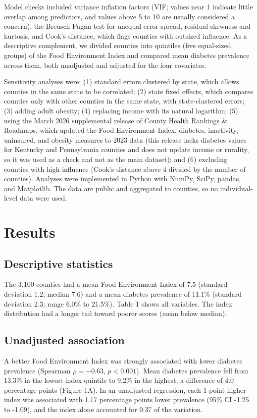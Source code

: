 \documentclass[12pt]{article}
\begin{document}
Model checks included variance inflation factors (VIF; values near 1 indicate little overlap among predictors, and values above 5 to 10 are usually considered a concern), the Breusch-Pagan test for unequal error spread, residual skewness and kurtosis, and Cook's distance, which flags counties with outsized influence. As a descriptive complement, we divided counties into quintiles (five equal-sized groups) of the Food Environment Index and compared mean diabetes prevalence across them, both unadjusted and adjusted for the four covariates.

Sensitivity analyses were: (1) standard errors clustered by state, which allows counties in the same state to be correlated; (2) state fixed effects, which compares counties only with other counties in the same state, with state-clustered errors; (3) adding adult obesity; (4) replacing income with its natural logarithm; (5) using the March 2026 supplemental release of County Health Rankings \& Roadmaps, which updated the Food Environment Index, diabetes, inactivity, uninsured, and obesity measures to 2023 data (this release lacks diabetes values for Kentucky and Pennsylvania counties and does not update income or rurality, so it was used as a check and not as the main dataset); and (6) excluding counties with high influence (Cook's distance above 4 divided by the number of counties). Analyses were implemented in Python with NumPy, SciPy, pandas, and Matplotlib. The data are public and aggregated to counties, so no individual-level data were used.

\section*{Results}
\subsection*{Descriptive statistics}
The 3,100 counties had a mean Food Environment Index of 7.5 (standard deviation 1.2; median 7.6) and a mean diabetes prevalence of 11.1\% (standard deviation 2.3; range 6.0\% to 21.5\%). Table 1 shows all variables. The index distribution had a longer tail toward poorer scores (mean below median).

\subsection*{Unadjusted association}
A better Food Environment Index was strongly associated with lower diabetes prevalence (Spearman $\rho = -0.63$, $p<0.001$). Mean diabetes prevalence fell from 13.3\% in the lowest index quintile to 9.2\% in the highest, a difference of 4.0 percentage points (Figure 1A). In an unadjusted regression, each 1-point higher index was associated with 1.17 percentage points lower prevalence (95\% CI -1.25 to -1.09), and the index alone accounted for 0.37 of the variation.
\end{document}
